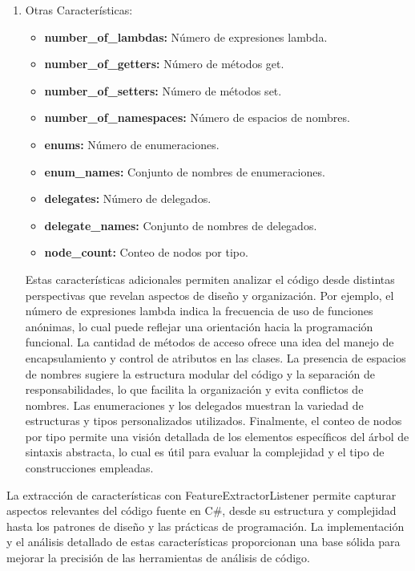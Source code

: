 \begin{enumerate}
    \item Otras Características:
    \begin{itemize}
        \item {\bf number\_of\_lambdas:} Número de expresiones lambda.
        \item {\bf number\_of\_getters:} Número de métodos get.
        \item {\bf number\_of\_setters:} Número de métodos set.
        \item {\bf number\_of\_namespaces:} Número de espacios de nombres.
        \item {\bf enums:} Número de enumeraciones.
        \item {\bf enum\_names:} Conjunto de nombres de enumeraciones.
        \item {\bf delegates:} Número de delegados.
        \item {\bf delegate\_names:} Conjunto de nombres de delegados.
        \item {\bf node\_count:} Conteo de nodos por tipo.
    \end{itemize}
    Estas características adicionales permiten analizar el código desde distintas perspectivas que revelan aspectos de diseño y organización. Por ejemplo, el número de expresiones lambda indica la frecuencia de uso de funciones anónimas, lo cual puede reflejar una orientación hacia la programación funcional. La cantidad de métodos de acceso ofrece una idea del manejo de encapsulamiento y control de atributos en las clases. La presencia de espacios de nombres sugiere la estructura modular del código y la separación de responsabilidades, lo que facilita la organización y evita conflictos de nombres. Las enumeraciones y los delegados muestran la variedad de estructuras y tipos personalizados utilizados. Finalmente, el conteo de nodos por tipo permite una visión detallada de los elementos específicos del árbol de sintaxis abstracta, lo cual es útil para evaluar la complejidad y el tipo de construcciones empleadas.
 
\end{enumerate}
    
        
La extracción de características con FeatureExtractorListener permite capturar aspectos relevantes del código fuente en C\#, desde su estructura y complejidad hasta los patrones de diseño y las prácticas de programación. La implementación y el análisis detallado de estas características proporcionan una base sólida para mejorar la precisión de las herramientas de análisis de código.



